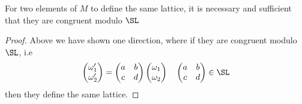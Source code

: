 \documentclass[12pt]{article}
\theoremstyle{definition}
\begin{document}
\begin{prop}[label=cong]
For two elements of \(M\) to define the same lattice, it is necessary and sufficient that they are congruent modulo \(\SL\) 
\end{prop}
\begin{proof}
Above we have shown one direction, where if  they are congruent modulo \(\SL \), i.e 
\[
    \begin{pmatrix}
         \omega _1^{\prime} \\ \omega _2^{\prime} \\
    \end{pmatrix} = \begin{pmatrix}
        a &  b \\
        c &  d \\
    \end{pmatrix} \begin{pmatrix}
        \omega _1  \\
        \omega _2  \\
    \end{pmatrix} \quad \begin{pmatrix}
        a &  b \\
        c &  d \\
    \end{pmatrix}\in\SL
\]  
then they define the same lattice. 


\end{proof}
\end{document}
